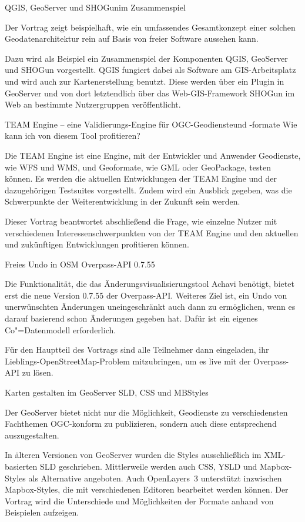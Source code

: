 %
{QGIS, GeoServer und SHOGun\linebreak im Zusammenspiel}%
{}%
{%
Der Vortrag zeigt beispielhaft, wie ein umfassendes Gesamtkonzept einer solchen
Geodatenarchitektur rein auf Basis von freier Software aussehen kann.

Dazu wird als Beispiel ein Zusammenspiel der Komponenten QGIS, GeoServer und
SHOGun vorgestellt. QGIS fungiert dabei als Software am GIS-Arbeitsplatz und
wird auch zur Kartenerstellung benutzt. Diese werden über ein Plugin in
GeoServer und von dort letztendlich über das Web-GIS-Framework SHOGun im Web an
bestimmte Nutzergruppen veröffentlicht.%
}

%
{TEAM Engine -- eine Validierungs-Engine für OGC-Geodienste\linebreak und \mbox{-formate}\vspace{0.2em}}%
{Wie kann ich von diesem Tool profitieren?}%
{%
Die TEAM Engine ist eine Engine, mit der Entwickler und Anwender Geodienste,
wie WFS und WMS, und Geoformate, wie GML oder GeoPackage, testen können.  Es
werden die aktuellen Entwicklungen der TEAM Engine und der dazugehörigen
Testsuites vorgestellt. Zudem wird ein Ausblick gegeben, was die Schwerpunkte
der Weiterentwicklung in der Zukunft sein werden.

Dieser Vortrag beantwortet abschließend die Frage, wie einzelne Nutzer mit
verschiedenen Interessenschwerpunkten von der TEAM Engine und den aktuellen und
zukünftigen Entwicklungen profitieren können.%
}

%
{Freies Undo in OSM}%
{Overpass-API 0.7.55}%
{%
Die Funktionalität, die das Änderungsvisualisierungstool Achavi benötigt, bietet erst die neue Version 0.7.55
der Overpass-API. Weiteres Ziel ist, ein Undo von unerwünschten Änderungen
uneingeschränkt auch dann zu ermöglichen, wenn es darauf basierend schon
Änderungen gegeben hat. Dafür ist ein eigenes Co"=Datenmodell erforderlich.

Für den Hauptteil des Vortrags sind alle Teilnehmer dann eingeladen, ihr
Lieblings-OpenStreetMap-Problem mitzubringen, um es live mit der Overpass-API zu lösen.%
}

%
{Karten gestalten im GeoServer}%
{SLD, CSS und MBStyles}%
{%
Der GeoServer bietet nicht nur die Möglichkeit, Geodienste zu verschiedensten
Fachthemen OGC-konform zu publizieren, sondern auch diese entsprechend
auszugestalten.

In älteren Versionen von GeoServer wurden die Styles ausschließlich im
XML-basierten SLD geschrieben. Mittlerweile werden auch CSS, YSLD und
Mapbox-Styles als Alternative angeboten.  Auch OpenLayers~3 unterstützt
inzwischen Mapbox-Styles, die mit verschiedenen Editoren bearbeitet werden
können. Der Vortrag wird die Unterschiede und Möglichkeiten der Formate anhand
von Beispielen aufzeigen.%
}

